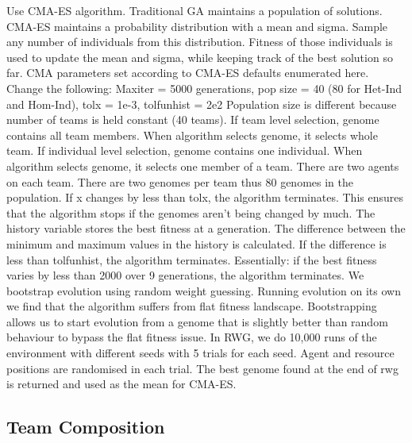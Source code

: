 \documentclass[sigconf]{aamas}  %
\begin{document}
Use CMA-ES algorithm. Traditional GA maintains a population of solutions. CMA-ES maintains a probability distribution with a mean and sigma. Sample any number of individuals from this distribution. Fitness of those individuals is used to update the mean and sigma, while keeping track of the best solution so far. CMA parameters set according to CMA-ES defaults enumerated here. Change the following:
Maxiter = 5000 generations, pop size = 40 (80 for Het-Ind and Hom-Ind), tolx = 1e-3, tolfunhist = 2e2
Population size is different because number of teams is held constant (40 teams). 
If team level selection, genome contains all team members. When algorithm selects genome, it selects whole team.
If individual level selection, genome contains one individual. When algorithm selects genome, it selects one member of a team. There are two agents on each team. There are two genomes per team thus 80 genomes in the population.
If x changes by less than tolx, the algorithm terminates. This ensures that the algorithm stops if the genomes aren’t being changed by much. 
The history variable stores the best fitness at a generation. The difference between the minimum and maximum values in the history is calculated. If the difference is less than tolfunhist, the algorithm terminates. Essentially: if the best fitness varies by less than 2000 over 9 generations, the algorithm terminates. 
We bootstrap evolution using random weight guessing. 
Running evolution on its own we find that the algorithm suffers from flat fitness landscape.
Bootstrapping allows us to start evolution from a genome that is slightly better than random behaviour to bypass the flat fitness issue.
In RWG, we do 10,000 runs of the environment with different seeds with 5 trials for each seed. Agent and resource positions are randomised in each trial.
The best genome found at the end of rwg is returned and used as the mean for CMA-ES.

\subsection{Team Composition}
\end{document}
